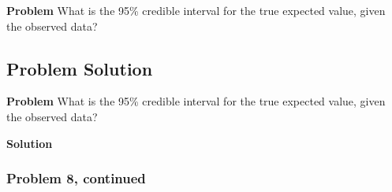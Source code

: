 \documentclass[12pt]{article}
\theoremstyle{definition}
\begin{document}
\noindent
{\bf Problem} What is the 95\% credible interval for the true expected value, given the observed data?


\subsection*{Problem Solution}

\noindent
{\bf Problem} What is the 95\% credible interval for the true expected value, given the observed data?

\bigskip
\noindent
{\bf Solution} 


\newpage
\subsubsection*{Problem 8, continued}
\end{document}
